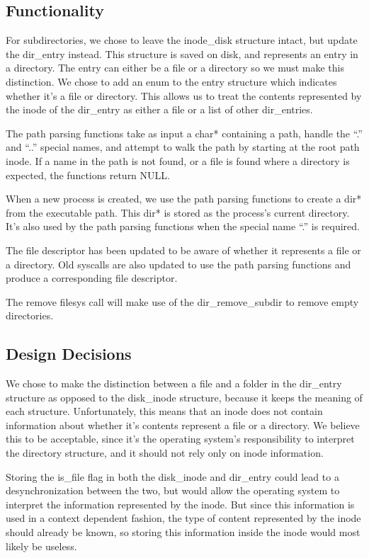 \subsection{Functionality}

For subdirectories, we chose to leave the inode\_disk structure intact, but update the dir\_entry instead. This structure is saved on disk, and represents an entry in a directory. The entry can either be a file or a directory so we must make this distinction. We chose to add an enum to the entry structure which indicates whether it's a file or directory. This allows us to treat the contents represented by the inode of the dir\_entry as either a file or a list of other dir\_entries.

The path parsing functions take as input a char* containing a path, handle the ``.'' and ``..'' special names, and attempt to walk the path by starting at the root path inode. If a name in the path is not found, or a file is found where a directory is expected, the functions return NULL.

When a new process is created, we use the path parsing functions to create a dir* from the executable path. This dir* is stored as the process's current directory. It's also used by the path parsing functions when the special name ``.'' is required.

The file descriptor has been updated to be aware of whether it represents a file or a directory. Old syscalls are also updated to use the path parsing functions and produce a corresponding file descriptor.

The remove filesys call will make use of the dir\_remove\_subdir to remove empty directories.

\subsection{Design Decisions}
  
We chose to make the distinction between a file and a folder in the dir\_entry structure as opposed to the disk\_inode structure, because it keeps the meaning of each structure. Unfortunately, this means that an inode does not contain information about whether it's contents represent a file or a directory. We believe this to be acceptable, since it's the operating system's responsibility to interpret the directory structure, and it should not rely only on inode information. 

Storing the is\_file flag in both the disk\_inode and dir\_entry could lead to a desynchronization between the two, but would allow the operating system to interpret the information represented by the inode. But since this information is used in a context dependent fashion, the type of content represented by the inode should already be known, so storing this information inside the inode would most likely be useless.

